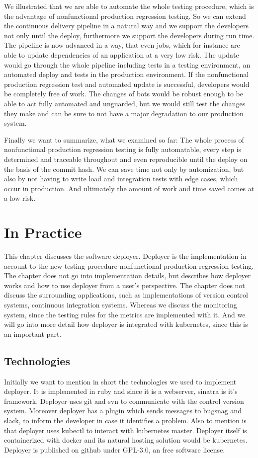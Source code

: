 We illustrated that we are able to automate the whole testing procedure, which is the
advantage of nonfunctional production regression testing. So we can extend the continuous
delivery pipeline in a natural way and we support the developers not only until the
deploy, furthermore we support the developers during run time. The pipeline is now
advanced in a way, that even jobs, which for instance are able to update dependencies of
an application at a very low risk. The update would go through the whole pipeline
including tests in a testing environment, an automated deploy and tests in the production
environment. If the nonfunctional production regression test and automated update is
successful, developers would be completely free of work. The changes of bots would be
robust enough to be able to act fully automated and unguarded, but we would still test the
changes they make and can be sure to not have a major degradation to our production
system.

Finally we want to summarize, what we examined so far: The whole process of nonfunctional
production regression testing is fully automatable, every step is determined and traceable
throughout and even reproducible until the deploy on the basis of the commit hash. We can
save time not only by automization, but also by not having to write load and integration
tests with edge cases, which occur in production. And ultimately the amount of work and
time saved comes at a low risk.

\chapter{In Practice}

This chapter discusses the software deployer. Deployer is the implementation in account to
the new testing procedure nonfunctional production regression testing. The chapter does
not go into implementation details, but describes how deployer works and how to use
deployer from a user's perspective. The chapter does not discuss the surrounding
applications, such as implementations of version control systems, continuous integration
systems. Whereas we discuss the monitoring system, since the testing rules for the metrics
are implemented with it. And we will go into more detail how deployer is integrated with
kubernetes, since this is an important part.

\section{Technologies}
Initially we want to mention in short the technologies we used to implement deployer. It
is implemented in ruby and since it is a webserver, sinatra is it's framework. Deployer
uses git and svn to communicate with the control version system. Moreover deployer has a
plugin which sends messages to bugsnag and slack, to inform the developer in case it
identifies a problem. Also to mention is that deployer uses kubectl to interact with
kubernetes master. Deployer itself is containerized with docker and its natural hosting
solution would be kubernetes. Deployer is published on github under GPL-3.0, an free
software license.

